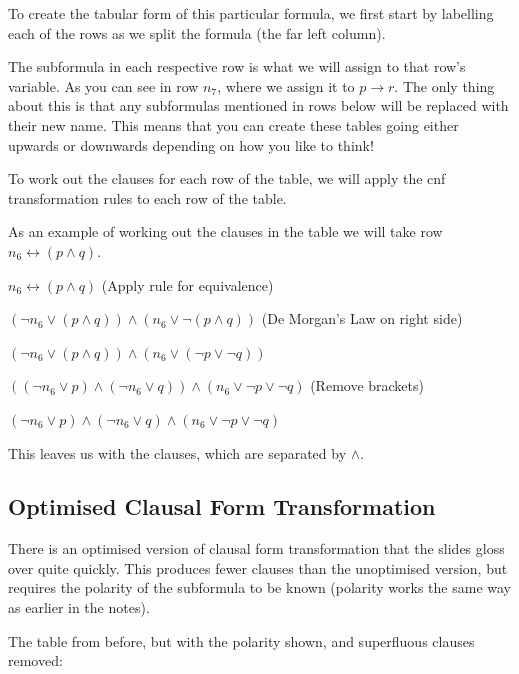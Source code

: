 \documentclass[11pt,a4paper]{article}
\begin{document}
To create the tabular form of this particular formula, we first start by labelling each of the rows as we split the formula (the far left column).

The subformula in each respective row is what we will assign to that row's variable. As you can see in row $n_7$, where we assign it to $p \rightarrow r$. The only thing about this is that any subformulas mentioned in rows below will be replaced with their new name. This means that you can create these tables going either upwards or downwards depending on how you like to think!

\rm
To work out the clauses for each row of the table, we will apply the cnf transformation rules to each row of the table.

As an example of working out the clauses in the table we will take row $n_6 \leftrightarrow (p \wedge q)$.

$n_6 \leftrightarrow (p \wedge q)$ (Apply rule for equivalence)

$(\neg n_6 \vee (p \wedge q)) \wedge (n_6 \vee \neg(p \wedge q))$ (De Morgan's Law on right side)

$(\neg n_6 \vee (p \wedge q)) \wedge (n_6 \vee (\neg p \vee \neg q))$

$((\neg n_6 \vee p) \wedge (\neg n_6 \vee q)) \wedge (n_6 \vee \neg p \vee \neg q)$ (Remove brackets)

$(\neg n_6 \vee p) \wedge (\neg n_6 \vee q) \wedge (n_6 \vee \neg p \vee \neg q)$

This leaves us with the clauses, which are separated by $\wedge$.

\subsection{Optimised Clausal Form Transformation}

There is an optimised version of clausal form transformation that the slides gloss over quite quickly. This produces fewer clauses than the unoptimised version, but requires the polarity of the subformula to be known (polarity works the same way as earlier in the notes).

The table from before, but with the polarity shown, and superfluous clauses removed:
\end{document}
